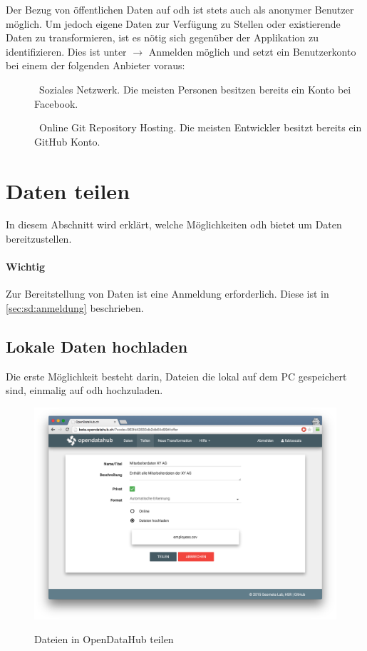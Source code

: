 Der Bezug von öffentlichen Daten auf \acl{odh} ist stets auch als anonymer Benutzer möglich. Um jedoch eigene Daten zur Verfügung zu Stellen oder existierende Daten zu transformieren, ist es nötig sich gegenüber der Applikation zu identifizieren. Dies ist unter  $\to$ Anmelden möglich und setzt ein Benutzerkonto bei einem der folgenden Anbieter voraus:

\begin{description}
\item[] \textendash\ Soziales Netzwerk. Die meisten Personen besitzen bereits ein Konto bei Facebook.
\item[] \textendash\ Online Git Repository Hosting. Die meisten Entwickler besitzt bereits ein GitHub Konto.
\end{description}


\section{Daten teilen}

In diesem Abschnitt wird erklärt, welche Möglichkeiten \acl{odh} bietet um Daten bereitzustellen.

\paragraph{Wichtig} Zur Bereitstellung von Daten ist eine Anmeldung erforderlich. Diese ist in \vref{sec:sd:anmeldung} beschrieben.

\subsection{Lokale Daten hochladen}
\label{sec:sd:teilen-datei}
Die erste Möglichkeit besteht darin, Dateien die lokal auf dem PC gespeichert sind, einmalig auf \acl{odh} hochzuladen.

\begin{figure}[H]
	\centering
	\includegraphics[width=\linewidth]{fig/screenshot-teilen-datei}
	\label{fig:sd:screenshot-teilen-datei}
	\caption{Dateien in OpenDataHub teilen}
\end{figure}



